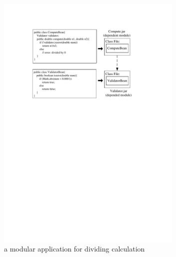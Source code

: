 \documentclass[conference]{IEEEtran}
\begin{document}
\begin{figure}[ht]
\centering
\includegraphics[width=3.5in]{ExampleEJB.pdf}
\caption{a modular application for dividing calculation}
\label{fig:example}
\end{figure}

\end{document}

